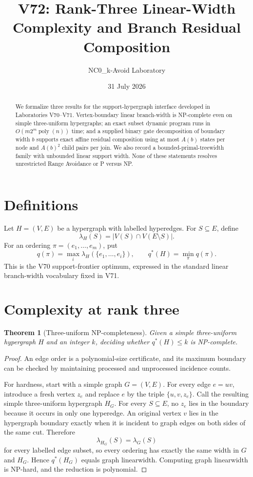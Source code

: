 \documentclass[11pt]{article}
\title{V72: Rank-Three Linear-Width Complexity and Branch Residual Composition}
\author{NC0\_k-Avoid Laboratory}
\date{31 July 2026}
\newtheorem{theorem}{Theorem}
\begin{document}
\maketitle

\begin{abstract}
We formalize three results for the support-hypergraph interface developed in
Laboratories V70--V71.  Vertex-boundary linear branch-width is NP-complete even
on simple three-uniform hypergraphs; an exact subset dynamic program runs in
$O(m2^m\operatorname{poly}(n))$ time; and a supplied binary gate decomposition
of boundary width $b$ supports exact affine residual composition using at most
$A(b)$ states per node and $A(b)^2$ child pairs per join.  We also record a
bounded-primal-treewidth family with unbounded linear support width.  None of
these statements resolves unrestricted Range Avoidance or P versus NP.
\end{abstract}

\section{Definitions}
Let $H=(V,E)$ be a hypergraph with labelled hyperedges.  For $S\subseteq E$,
define
\[
 \lambda_H(S)=\bigl|V(S)\cap V(E\setminus S)\bigr|.
\]
For an ordering $\pi=(e_1,\ldots,e_m)$, put
\[
 q(\pi)=\max_i\lambda_H(\{e_1,\ldots,e_i\}),\qquad
 q^*(H)=\min_\pi q(\pi).
\]
This is the V70 support-frontier optimum, expressed in the standard linear
branch-width vocabulary fixed in V71.

\section{Complexity at rank three}
\begin{theorem}[Three-uniform NP-completeness]
Given a simple three-uniform hypergraph $H$ and an integer $k$, deciding whether
$q^*(H)\le k$ is NP-complete.
\end{theorem}

\begin{proof}
An edge order is a polynomial-size certificate, and its maximum boundary can be
checked by maintaining processed and unprocessed incidence counts.

For hardness, start with a simple graph $G=(V,E)$.  For every edge $e=uv$,
introduce a fresh vertex $z_e$ and replace $e$ by the triple
$\{u,v,z_e\}$.  Call the resulting simple three-uniform hypergraph $H_G$.
For every $S\subseteq E$, no $z_e$ lies in the boundary because it occurs in
only one hyperedge.  An original vertex $v$ lies in the hypergraph boundary
exactly when it is incident to graph edges on both sides of the same cut.
Therefore
\[
 \lambda_{H_G}(S)=\lambda_G(S)
\]
for every labelled edge subset, so every ordering has exactly the same width in
$G$ and $H_G$.  Hence $q^*(H_G)$ equals graph linearwidth.  Computing graph
linearwidth is NP-hard, and the reduction is polynomial.
\end{proof}
\end{document}
